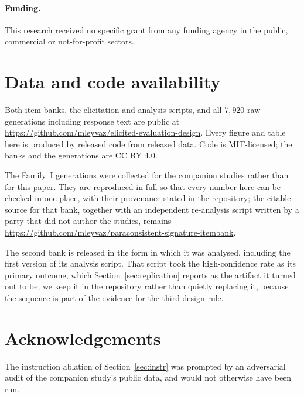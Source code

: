 \documentclass[11pt,letterpaper]{article}
\begin{document}
\paragraph{Funding.} This research received no specific grant from any funding agency in the
public, commercial or not-for-profit sectors.

\section*{Data and code availability}

Both item banks, the elicitation and analysis scripts, and all $7{,}920$ raw generations
including response text are public at
\url{https://github.com/mleyvaz/elicited-evaluation-design}. Every figure and table here is
produced by released code from released data. Code is MIT-licensed; the banks and the
generations are CC BY 4.0.

The Family~I generations were collected for the companion studies rather than for this paper.
They are reproduced in full so that every number here can be checked in one place, with their
provenance stated in the repository; the citable source for that bank, together with an
independent re-analysis script written by a party that did not author the studies, remains
\url{https://github.com/mleyvaz/paraconsistent-signature-itembank}.

The second bank is released in the form in which it was analysed, including the first version of
its analysis script. That script took the high-confidence rate as its primary outcome, which
Section~\ref{sec:replication} reports as the artifact it turned out to be; we keep it in the
repository rather than quietly replacing it, because the sequence is part of the evidence for the
third design rule.

\section*{Acknowledgements}

The instruction ablation of Section~\ref{sec:instr} was prompted by an adversarial audit of the
companion study's public data, and would not otherwise have been run.

{\small

}
\end{document}

